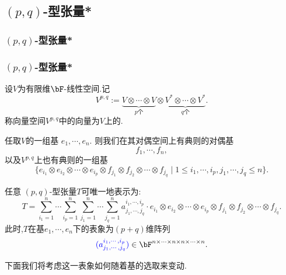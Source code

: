 \subsection{$(p,q)$-型张量*}

\subsubsection{$(p,q)$-型张量*}
\begin{frame}\frametitle{$(p,q)$-型张量*}
设$V$为有限维$\bF$-线性空间.记
\[V^{p,q}:= \underbrace{V\otimes\cdots\otimes V}_{p\text{个}}\otimes\underbrace{V^*\otimes\cdots\otimes V^*}_{q\text{个}}.\]
\pp
称向量空间$V^{p,q}$中的向量为$V$上的.
\pp
\begin{lemma}
任取$V$的一组基 $e_1,\cdots,e_n$. 则我们在其对偶空间上有典则的对偶基
\[f_1,\cdots,f_n,\]
以及$V^{p,q}$上也有典则的一组基
\[\{e_{i_1}\otimes e_{i_2}\otimes \cdots \otimes e_{i_p}\otimes f_{j_1}\otimes f_{j_2}\otimes \cdots \otimes f_{j_q} \mid 1\leq i_1,\cdots,i_p,j_1,\cdots,j_q\leq n\}.\]
\end{lemma}
\pp
任意 $(p,q)$-型张量$T$可唯一地表示为:
\[T = \sum_{i_1=1}^{n}\cdots\sum_{i_p=1}^{n} \sum_{j_1=1}^{n}\cdots\sum_{j_q=1}^{n} a^{i_1,\cdots,i_p}_{j_1,\cdots,j_q} \cdot e_{i_1}\otimes e_{i_2}\otimes \cdots \otimes e_{i_p}\otimes f_{j_1}\otimes f_{j_2}\otimes \cdots \otimes f_{j_q}.\]
\pp
此时,$T$在基$e_1,\cdots,e_n$下的表象为$(p+q)$维阵列
\[\blue{(a^{i_1,\cdots,i_p}_{j_1,\cdots,j_q})} \in \bF^{n\times \cdots\times n\times n\times \cdots\times n}.\]
\pp

下面我们将考虑这一表象如何随着基的选取来变动.
\end{frame}





